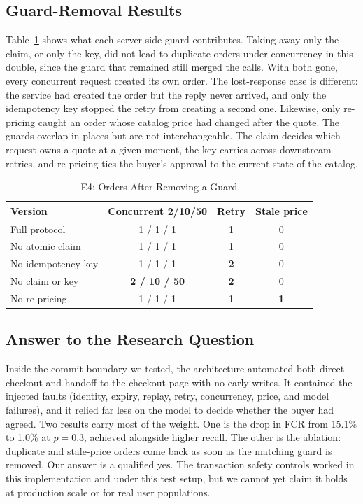 \documentclass{IEEEtran}
\begin{document}
\subsection{Guard-Removal Results}

Table~\ref{tab:ablation} shows what each server-side guard contributes. Taking away only the claim, or only the key, did not lead to duplicate orders under concurrency in this double, since the guard that remained still merged the calls. With both gone, every concurrent request created its own order. The lost-response case is different: the service had created the order but the reply never arrived, and only the idempotency key stopped the retry from creating a second one. Likewise, only re-pricing caught an order whose catalog price had changed after the quote. The guards overlap in places but are not interchangeable. The claim decides which request owns a quote at a given moment, the key carries across downstream retries, and re-pricing ties the buyer's approval to the current state of the catalog.

\begin{table}[t]
\caption{E4: Orders After Removing a Guard}
\label{tab:ablation}
\centering
\footnotesize
\setlength{\tabcolsep}{3.5pt}
\begin{tabular}{@{}lccc@{}}
\toprule
Version & Concurrent 2/10/50 & Retry & Stale price \\
\midrule
Full protocol & 1 / 1 / 1 & 1 & 0 \\
No atomic claim & 1 / 1 / 1 & 1 & 0 \\
No idempotency key & 1 / 1 / 1 & \textbf{2} & 0 \\
No claim or key & \textbf{2 / 10 / 50} & \textbf{2} & 0 \\
No re-pricing & 1 / 1 / 1 & 1 & \textbf{1} \\
\bottomrule
\end{tabular}
\end{table}

\subsection{Answer to the Research Question}

Inside the commit boundary we tested, the architecture automated both direct checkout and handoff to the checkout page with no early writes. It contained the injected faults (identity, expiry, replay, retry, concurrency, price, and model failures), and it relied far less on the model to decide whether the buyer had agreed. Two results carry most of the weight. One is the drop in FCR from 15.1\% to 1.0\% at $p=0.3$, achieved alongside higher recall. The other is the ablation: duplicate and stale-price orders come back as soon as the matching guard is removed. Our answer is a qualified yes. The transaction safety controls worked in this implementation and under this test setup, but we cannot yet claim it holds at production scale or for real user populations.
\end{document}
